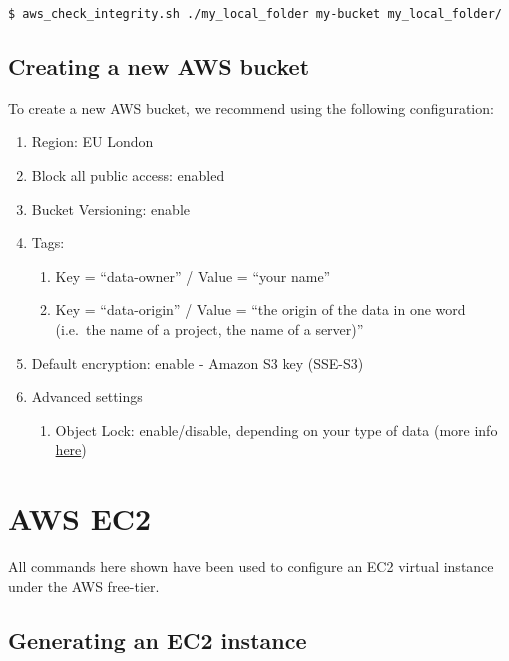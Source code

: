 \documentclass[]{book}
\providecommand{\tightlist}{%
  \setlength{\itemsep}{0pt}\setlength{\parskip}{0pt}}
\begin{document}
\begin{verbatim}
$ aws_check_integrity.sh ./my_local_folder my-bucket my_local_folder/
\end{verbatim}

\subsection{Creating a new AWS bucket}\label{creating-a-new-aws-bucket}

To create a new AWS bucket, we recommend using the following
configuration:

\begin{enumerate}
\def\labelenumi{\arabic{enumi}.}
\tightlist
\item
  Region: EU London
\item
  Block all public access: enabled
\item
  Bucket Versioning: enable
\item
  Tags:

  \begin{enumerate}
  \def\labelenumii{\arabic{enumii}.}
  \tightlist
  \item
    Key = ``data-owner'' / Value = ``your name''
  \item
    Key = ``data-origin'' / Value = ``the origin of the data in one word
    (i.e.~the name of a project, the name of a server)''
  \end{enumerate}
\item
  Default encryption: enable - Amazon S3 key (SSE-S3)
\item
  Advanced settings

  \begin{enumerate}
  \def\labelenumii{\arabic{enumii}.}
  \tightlist
  \item
    Object Lock: enable/disable, depending on your type of data (more
    info
    \href{https://docs.aws.amazon.com/AmazonS3/latest/dev/object-lock.html}{here})
  \end{enumerate}
\end{enumerate}

\section{AWS EC2}\label{aws-ec2}

All commands here shown have been used to configure an EC2 virtual
instance under the AWS free-tier.

\subsection{Generating an EC2
instance}\label{generating-an-ec2-instance}
\end{document}
